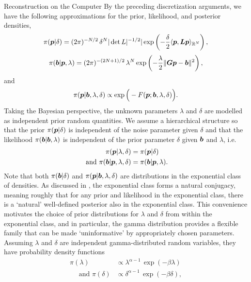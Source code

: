\begin{chapter}{Reconstruction on the Computer}
By the preceding discretization arguments, we have the following approximations for the prior, likelihood, and posterior densities,
\begin{equation}\label{eq:discretePrior}
  \pi(\mbox{\boldmath$p$}| \delta) =(2\pi)^{-N/2}\,\delta^N |\det L|^{-1/2}|\exp\left(-\frac \delta2 \langle \mbox{\boldmath$p$},\mbox{\boldmath$L$}\mbox{\boldmath$p$}\rangle_{\mathbb R^N}\right),
\end{equation}
\begin{equation} \label{eq:discreteLiklihood}
  \pi(\mbox{\boldmath$b$} |\mbox{\boldmath$p$},\lambda) = (2\pi)^{-(2N+1)/2}\,\lambda^N \exp\left(-\frac \lambda2 \|\mbox{\boldmath$G$}\mbox{\boldmath$p$}-\mbox{\boldmath$b$}\|^2\right),
\end{equation}
and
\begin{equation}\label{eq:discretePosterior}
  \pi(\mbox{\boldmath$p$} | \mbox{\boldmath$b$},\lambda, \delta) \propto \exp\Big(-F(\mbox{\boldmath$p$};\mbox{\boldmath$b$},\lambda,\delta) \Big).
\end{equation}
Taking the Bayesian perspective, the unknown parameters $\lambda$ and $\delta$ are modelled as independent prior random quantities.
We assume a hierarchical structure so that the prior $\pi(\mbox{\boldmath$p$}|\delta)$ is independent of the noise parameter given $\delta$ and that the likelihood $\pi(\mbox{\boldmath$b$}|\mbox{\boldmath$b$},\lambda)$ is independent of the prior parameter $\delta$ given $\mbox{\boldmath$b$}$ and $\lambda$, i.e.
\begin{align}
  \pi(\mbox{\boldmath$p$}|\lambda,\delta) &= \pi(\mbox{\boldmath$p$}|\delta) \\
\text{ and } \pi(\mbox{\boldmath$b$}|\mbox{\boldmath$p$},\lambda,\delta) &= \pi(\mbox{\boldmath$b$}|\mbox{\boldmath$p$},\lambda).
\end{align}
Note that both $\pi(\mbox{\boldmath$b$}|\delta)$ and $\pi(\mbox{\boldmath$p$}|\mbox{\boldmath$b$},\lambda,\delta)$ are distributions in the exponential class of densities.
As discussed in \citep{gelman2014bayesian}, the exponential class forms a natural conjugacy, meaning roughly that for any prior and likelihood in the exponential class, there is a `natural' well-defined posterior also in the exponential class.
This convenience motivates the choice of prior distributions for $\lambda$ and $\delta$ from within the exponential class, and in particular, the gamma distribution provides a flexible family that can be made `uninformative' by appropriately chosen parameters.
Assuming $\lambda$ and $\delta$ are independent gamma-distributed random variables, they have probability density functions 
\begin{align} 
                \pi(\lambda) &\propto \lambda^{\alpha -1}\,\exp(-\beta\lambda)\label{eq:deltaPrior}\\
\quad\text{ and }\pi(\delta) &\propto \delta^{\alpha-1}\,\exp(-\beta\delta), \label{eq:lambdaPrior}

\end{align}
\end{chapter}
